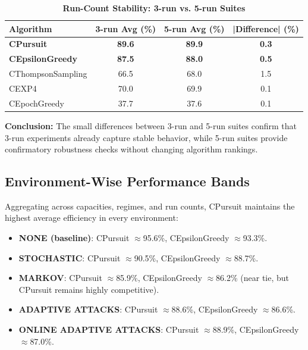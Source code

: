 \documentclass[12pt,a4paper]{article}
\newcommand{\success}[1]{\textcolor{successcolor}{\textbf{#1}}}
\begin{document}
\begin{table}[H]
\centering
\caption{\success{Run-Count Stability: 3-run vs. 5-run Suites}}
\begin{tabular}{|l|c|c|c|}
\hline
\textbf{Algorithm} & \textbf{3-run Avg (\%)} & \textbf{5-run Avg (\%)} & \textbf{|Difference| (\%)} \\
\hline
\hline
\success{CPursuit}        & \success{89.6} & \success{89.9} & \success{0.3} \\
\success{CEpsilonGreedy} & \success{87.5} & \success{88.0} & \success{0.5} \\
CThompsonSampling        & 66.5          & 68.0          & 1.5 \\
CEXP4                    & 70.0          & 69.9          & 0.1 \\
CEpochGreedy             & 37.7          & 37.6          & 0.1 \\
\hline
\end{tabular}
\end{table}

\textbf{Conclusion:} The small differences between 3-run and 5-run suites confirm that 3-run experiments already capture stable behavior, while 5-run suites provide confirmatory robustness checks without changing algorithm rankings.

\subsection{Environment-Wise Performance Bands}

Aggregating across capacities, regimes, and run counts, CPursuit maintains the highest average efficiency in every environment:

\begin{itemize}
\item \textbf{NONE (baseline)}: CPursuit $\approx$95.6\%, CEpsilonGreedy $\approx$93.3\%.
\item \textbf{STOCHASTIC}: CPursuit $\approx$90.5\%, CEpsilonGreedy $\approx$88.7\%.
\item \textbf{MARKOV}: CPursuit $\approx$85.9\%, CEpsilonGreedy $\approx$86.2\% (near tie, but CPursuit remains highly competitive).
\item \textbf{ADAPTIVE ATTACKS}: CPursuit $\approx$88.6\%, CEpsilonGreedy $\approx$86.6\%.
\item \textbf{ONLINE ADAPTIVE ATTACKS}: CPursuit $\approx$88.9\%, CEpsilonGreedy $\approx$87.0\%.
\end{itemize}
\end{document}
